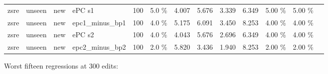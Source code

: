 \documentclass[10pt,a4paper]{article}
\begin{document}
\begin{center}
\begin{tabularx}{\textwidth}{@{}p{}XXXXXXXXXXXX@{}}
zsre & unseen & new & ePC s1 & 100 & 5.0 \% & 4.007 & 5.676 & 3.339 & 6.349 & 5.00 \% & 5.00 \% &  \\
zsre & unseen & new & epc1\_minus\_bp1 & 100 & 4.0 \% & 5.175 & 6.091 & 3.450 & 8.253 & 4.00 \% & 4.00 \% &  \\
zsre & unseen & new & ePC s2 & 100 & 4.0 \% & 4.043 & 5.676 & 2.696 & 6.349 & 4.00 \% & 4.00 \% &  \\
zsre & unseen & new & epc2\_minus\_bp2 & 100 & 2.0 \% & 5.820 & 3.436 & 1.940 & 8.253 & 2.00 \% & 2.00 \% &  \\
\bottomrule
\end{tabularx}
\end{center}



Worst fifteen regressions at 300 edits:
\end{document}
